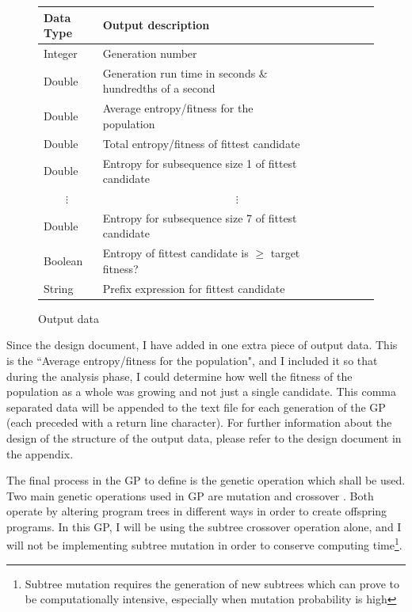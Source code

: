 \documentclass[a4paper,10.5pt]{article}
\begin{document}
\begin{figure}[]
\centering
\caption{Output data}
\label{outputparam}
\begin{tabular}{l*{6}{l}r}
Data Type             & Output description\\
\hline
Integer & Generation number\\
Double & Generation run time in seconds \& hundredths of a second \\
Double & Average entropy/fitness for the population\\
Double & Total entropy/fitness of fittest candidate\\
Double & Entropy for subsequence size 1 of fittest candidate\\
\ \ \ \ $\vdots$ & \ \ \ \ \ \ \ \ \ \ \ \ \ \ \ \ \ \ \ \ \ \ \ \ $\vdots$\\
Double & Entropy for subsequence size 7 of fittest candidate\\
Boolean & Entropy of fittest candidate is $\geq$ target fitness?\\
String & Prefix expression for fittest candidate\\
\end{tabular}
\end{figure}


Since the design document, I have added in one extra piece of output data. This is the ``Average entropy/fitness for the population", and I included it so that during the analysis phase, I could determine how well the fitness of the population as a whole was growing and not just a single candidate. This comma separated data will be appended to the text file for each generation of the GP (each preceded with a return line character). For further information about the design of the structure of the output data, please refer to the design document in the appendix.

The final process in the GP to define is the genetic operation which shall be used. Two main genetic operations used in GP are mutation and crossover \cite[p.15-17]{introgp}. Both operate by altering program trees in different ways in order to create offspring programs. In this GP, I will be using the subtree crossover operation alone, and I will not be implementing subtree mutation in order to conserve computing time\footnote{Subtree mutation requires the generation of new subtrees which can prove to be computationally intensive, especially when mutation probability is high}.  
\end{document}
